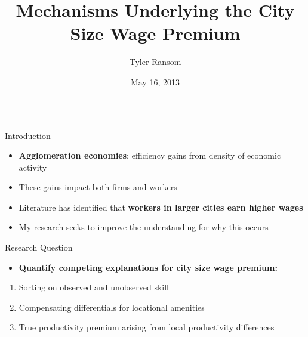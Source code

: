 \documentclass[english,final,t]{beamer}
\title{\huge Mechanisms Underlying the City Size Wage Premium}
\author[Ransom]{Tyler Ransom}
\institute[Duke University]{Department of Economics, Duke University}
\date[May 16, 2013]{May 16, 2013}
\begin{document}
\begin{frame}{}
\begin{part}{}
  \begin{columns}[t]
    \begin{column}{.22\linewidth}


      \begin{block}{Introduction}
        \begin{itemize}
				\item \textbf{Agglomeration economies}: efficiency gains from density of economic activity
				\item These gains impact both firms and workers
				\item Literature has identified that \textbf{workers in larger cities earn higher wages}
				\item My research seeks to improve the understanding for why this occurs
        \end{itemize}
      \end{block}
			
      \begin{block}{Research Question}
        \begin{itemize}
				\item \textbf{Quantify competing explanations for city size wage premium:}
        \end{itemize}
				\begin{enumerate}
				\item Sorting on observed and unobserved skill
				\item Compensating differentials for locational amenities
				\item True productivity premium arising from local productivity differences
				\end{enumerate}
      \end{block}
    \end{column}



\end{columns}
\end{part}
\end{frame}
\end{document}
